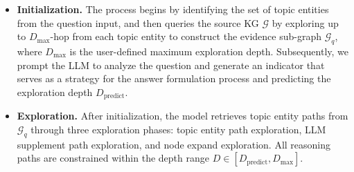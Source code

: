 \begin{itemize}[leftmargin=*]

    \item \textbf{Initialization.} The process begins by identifying the set of topic entities from the question input, and then queries the source KG $\mathcal{G}$ by exploring up to $D_{\max}$-hop from each topic entity to construct the evidence sub-graph $\mathcal{G}_q$, where $D_{\max}$ is the user-defined maximum exploration depth. 
    Subsequently, we prompt the LLM to analyze the question and generate an indicator that serves as a strategy for the answer formulation process and predicting the  exploration depth $D_{\text{predict}}$.




    \item \textbf{Exploration.} After initialization, the model retrieves topic entity paths from $\mathcal{G}_q$ through three exploration phases: topic entity path exploration, LLM supplement path exploration, and node expand exploration. All reasoning paths are constrained within the depth range $D \in [D_{\text{predict}}, D_{\max}]$.

    


\end{itemize}

